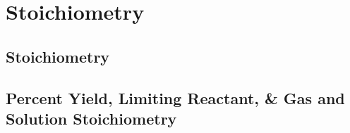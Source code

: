 \documentclass[../hchem.tex]{subfiles}
\begin{document}
\chapter{Stoichiometry}
\section{Stoichiometry}
\section{Percent Yield, Limiting Reactant, \& Gas and Solution Stoichiometry}
\end{document}
